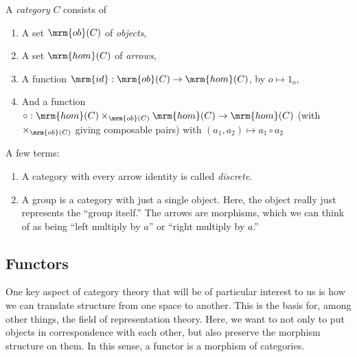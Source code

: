 \documentclass[nocover]{pset}
\newcommand{\ob}{\mrm{ob}}
\newcommand{\homm}{\mrm{hom}}
\begin{document}
\begin{definition}[Category]
  A \emph{category} $C$ consists of
  \begin{enumerate}[label=\arabic*)]
    \item A set $\ob(C)$ of \emph{objects},
    \item A set $\homm(C)$ of \emph{arrows},
    \item A function $\mrm{id} : \ob(C) \to \homm(C)$, by $o \mapsto
      1_o$,
    \item And a function $\circ : \homm(C) \times_{\ob(C)} \homm(C)
      \to \homm(C)$ (with $\times_{\ob(C)}$ giving composable pairs)
      with $(a_1, a_2) \mapsto a_1 \circ a_2$
  \end{enumerate}
\end{definition}

A few terms:
\begin{enumerate}
  \item A category with every arrow identity is called
    \emph{discrete}.
  \item A group is a category with just a single object. Here, the
    object really just represents the ``group itself.'' The arrows are
    morphisms, which we can think of as being ``left multiply by $a$''
    or ``right multiply by $a$.''
\end{enumerate}

\subsection*{Functors}
One key aspect of category theory that will be of particular interest
to us is how we can translate structure from one space to another.
This is the basis for, among other things, the field of representation
theory. Here, we want to not only to put objects in correspondence
with each other, but also preserve the morphism structure on them. In
this sense, a functor is a morphism of categories.
\end{document}
